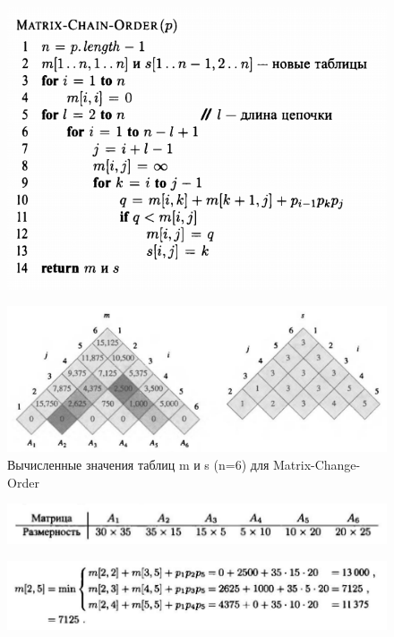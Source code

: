 \documentclass{beamer}
\begin{document}
\begin{frame}[t]
   \begin{figure}[h]
		\centering
		\includegraphics[scale=0.6]{images/lec09-pic14.png}
	\end{figure}
\end{frame}

\begin{frame}[t]
   \begin{figure}[h]
		\centering
		\includegraphics[scale=0.35]{images/lec09-pic15.png}
		\caption{Вычисленные значения таблиц m и s (n=6) для Matrix-Change-Order}
	\end{figure}
	
    \begin{figure}[h]
		\centering
		\includegraphics[scale=0.35]{images/lec09-pic16.png}
	\end{figure}
	
    \begin{figure}[h]
		\centering
		\includegraphics[scale=0.35]{images/lec09-pic17.png}
	\end{figure}	
\end{frame}
\end{document}
